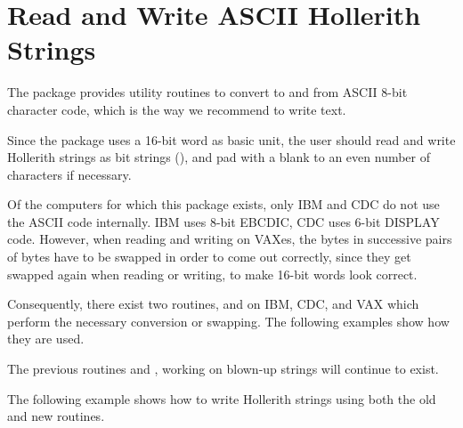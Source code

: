 \newpage


\section{Read and Write ASCII Hollerith Strings}

The package provides utility routines to convert to and from ASCII 8-bit
character code, which is the way we recommend to write text.
 
Since the package uses a 16-bit word as basic unit,
the user should read and write Hollerith strings as bit
strings (), and pad with a
blank to an even number of characters if necessary.
 
Of the computers for which this package exists, only IBM and CDC do not
use the ASCII code internally. 
IBM uses 8-bit EBCDIC, CDC uses 6-bit
DISPLAY code. 
However, when reading and writing on VAXes, the bytes in
successive pairs of bytes have to be swapped in order to come out
correctly, since they get swapped again when reading or writing, to make
16-bit words look correct.
 
Consequently, there exist two routines,  and 
 on IBM, CDC,
and VAX which perform the necessary conversion or swapping. The
following examples show how they are used.
 
The previous routines  and , working on blown-up
strings will continue to exist.

The following example shows how to write Hollerith strings
using both the old and new routines.

\label{sec:exahollerith}


